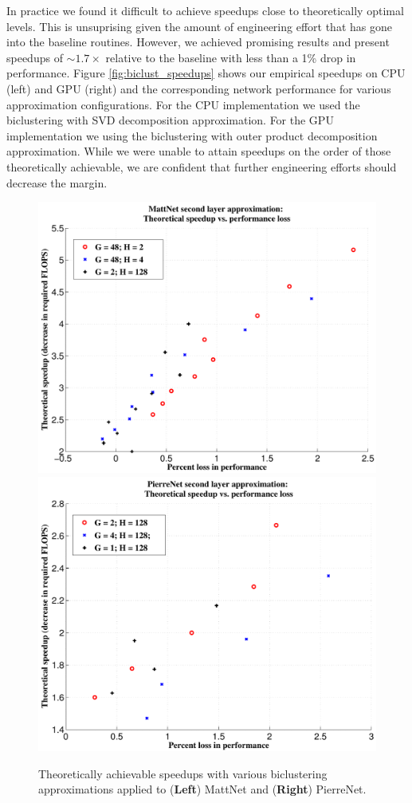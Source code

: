 In practice we found it difficult to achieve speedups close to theoretically optimal levels. This is unsuprising given the amount of engineering effort that has gone into the baseline routines. However, we achieved promising results and present speedups of $\sim1.7\times$ relative to the baseline with less than a 1\% drop in performance.
Figure \ref{fig:biclust_speedups} shows our empirical speedups on CPU
(left) and GPU (right) and the corresponding network performance for
various approximation configurations. For the CPU implementation we used the biclustering with SVD decomposition approximation. For the GPU implementation we using the biclustering with outer product decomposition approximation.  
While we were unable to attain speedups on the order of those theoretically achievable, we are confident that further engineering efforts should decrease the margin.   

\begin{figure}[t]
\centering
\begin{minipage}{0.75\textwidth}
  \includegraphics[width=0.5\linewidth]{img/layer2_theoreticalspeedup_vs_performance_loss.pdf} 
  \quad\quad
  \includegraphics[width=0.5\linewidth]{img/layer2_theoreticalspeedup_vs_performance_loss_pierre.pdf} 
\end{minipage}
\caption{Theoretically achievable speedups with various biclustering approximations applied to ({\bf Left}) MattNet and ({\bf Right}) PierreNet.}
\label{fig:biclustering_theory}
\end{figure}

